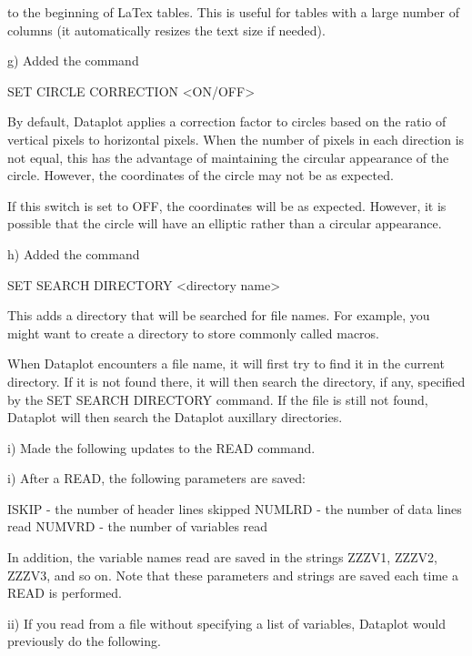           \resizebox{\linewidth}{!} {

       to the beginning of LaTex tables.  This is useful for tables with a
       large number of columns (it automatically resizes the text size if
       needed).

    g) Added the command

          SET CIRCLE CORRECTION <ON/OFF>

       By default, Dataplot applies a correction factor to circles based
       on the ratio of vertical pixels to horizontal pixels.  When the
       number of pixels in each direction is not equal, this has the
       advantage of maintaining the circular appearance of the circle.
       However, the coordinates of the circle may not be as expected.

       If this switch is set to OFF, the coordinates will be as
       expected.  However, it is possible that the circle will have an
       elliptic rather than a circular appearance.

    h) Added the command

         SET SEARCH DIRECTORY  <directory name>

       This adds a directory that will be searched for file names.
       For example, you might want to create a directory to store
       commonly called macros.

       When Dataplot encounters a file name, it will first try to
       find it in the current directory.  If it is not found there,
       it will then search the directory, if any, specified by the
       SET SEARCH DIRECTORY command.  If the file is still not
       found, Dataplot will then search the Dataplot auxillary
       directories.

    i) Made the following updates to the READ command.

          i) After a READ, the following parameters are saved:

               ISKIP  - the number of header lines skipped
               NUMLRD - the number of data lines read
               NUMVRD - the number of variables read

             In addition, the variable names read are saved in the
             strings ZZZV1, ZZZV2, ZZZV3, and so on.  Note that these
             parameters and strings are saved each time a READ is
             performed.

         ii) If you read from a file without specifying a list of
             variables, Dataplot would previously do the following.

}
